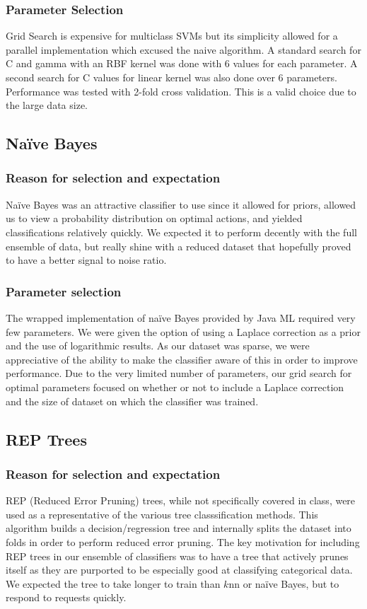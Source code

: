 \documentclass[]{article}   %
\begin{document}
\subsubsection{Parameter Selection}
Grid Search is expensive for multiclass SVMs but its simplicity allowed for a parallel implementation which excused the naive algorithm.  A standard search for C and gamma with an RBF kernel was done with 6 values for each parameter. A second search for C values for linear kernel was also done over 6 parameters.  Performance was tested with 2-fold cross validation. This is a valid choice due to the large data size.


\subsection{Na\"{i}ve Bayes}
\subsubsection{Reason for selection and expectation}
Na\"{i}ve Bayes was an attractive classifier to use since it allowed for priors, allowed us to view a probability 
distribution on optimal actions, and yielded classifications relatively quickly. We expected it to perform decently 
with the full ensemble of data, but really shine with a reduced dataset that hopefully proved to have a better 
signal to noise ratio. 

\subsubsection{Parameter selection}
The wrapped implementation of na\"{i}ve Bayes provided by Java ML required very few parameters. We were given the 
option of using a Laplace correction as a prior and the use of logarithmic results. As our dataset was sparse, we 
were appreciative of the ability to make the classifier aware of this in order to improve performance. Due to the 
very limited number of parameters, our grid search for optimal parameters focused on whether or not to include a 
Laplace correction and the size of dataset on which the classifier was trained. 

\subsection{REP Trees}
\subsubsection{Reason for selection and expectation}
REP (Reduced Error Pruning) trees, while not specifically covered in class, were used as a representative of the 
various tree classsification methods. This algorithm builds a decision/regression tree and internally splits the 
dataset into folds in order to perform reduced error pruning. The key motivation for including REP trees in our 
ensemble of classifiers was to have a tree that actively prunes itself as they are purported to be especially good 
at classifying categorical data. We expected the tree to take longer to train than $k$nn or na\"{i}ve Bayes, but to 
respond to requests quickly.
\end{document}
